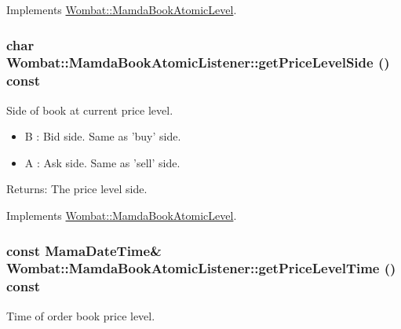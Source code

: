 Implements \hyperlink{classWombat_1_1MamdaBookAtomicLevel_01015a77e67f21af4f1b53f25d6df2f0}{Wombat::Mamda\-Book\-Atomic\-Level}.\hypertarget{classWombat_1_1MamdaBookAtomicListener_3031081549b1df511c872068f58e8ade}{
\subsubsection[getPriceLevelSide]{\setlength{\rightskip}{0pt plus 5cm}char Wombat::Mamda\-Book\-Atomic\-Listener::get\-Price\-Level\-Side () const}}
\label{classWombat_1_1MamdaBookAtomicListener_3031081549b1df511c872068f58e8ade}


Side of book at current price level. 

\begin{itemize}
\item B : Bid side. Same as 'buy' side. \item A : Ask side. Same as 'sell' side. \end{itemize}


\begin{Desc}
\item[Returns:]The price level side. \end{Desc}


Implements \hyperlink{classWombat_1_1MamdaBookAtomicLevel_db64c3729d50e3334a5d1eeb40aba6a4}{Wombat::Mamda\-Book\-Atomic\-Level}.\hypertarget{classWombat_1_1MamdaBookAtomicListener_85bb50891ec86cc8e1850b4097498a89}{
\subsubsection[getPriceLevelTime]{\setlength{\rightskip}{0pt plus 5cm}const Mama\-Date\-Time\& Wombat::Mamda\-Book\-Atomic\-Listener::get\-Price\-Level\-Time () const}}
\label{classWombat_1_1MamdaBookAtomicListener_85bb50891ec86cc8e1850b4097498a89}


Time of order book price level. 

